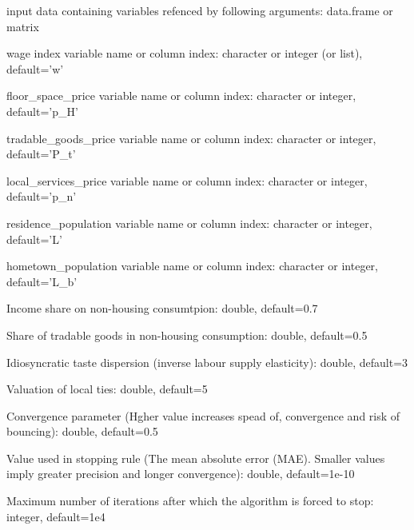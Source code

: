 \documentclass[a4paper]{book}
\begin{document}
\begin{Arguments}
\begin{ldescription}
\item[\code{df}] input data containing variables refenced by 
following arguments: data.frame or matrix

\item[\code{w}] wage index variable name or column index:
character or integer (or list), default='w'

\item[\code{p\_H}] floor\_space\_price variable name or column index:
character or integer, default='p\_H'

\item[\code{P\_t}] tradable\_goods\_price variable name or column index:
character or integer, default='P\_t'

\item[\code{p\_n}] local\_services\_price variable name or column index:
character or integer, default='p\_n'

\item[\code{L}] residence\_population variable name or column index:
character or integer, default='L'

\item[\code{L\_b}] hometown\_population variable name or column index:
character or integer, default='L\_b'

\item[\code{alpha}] Income share on non-housing consumtpion:
double, default=0.7

\item[\code{beta}] Share of tradable goods in non-housing consumption:
double, default=0.5

\item[\code{gamma}] Idiosyncratic taste dispersion (inverse labour
supply elasticity):
double, default=3

\item[\code{xi}] Valuation of local ties: double, default=5

\item[\code{conv}] Convergence parameter (Hgher value increases spead of,
convergence and risk of bouncing): double, default=0.5

\item[\code{tolerance}] Value used in stopping rule (The mean absolute error (MAE).
Smaller values imply greater precision and longer convergence):
double, default=1e-10

\item[\code{maxiter}] Maximum number of iterations after which the algorithm
is forced to stop: integer, default=1e4
\end{ldescription}
\end{Arguments}
\end{document}
